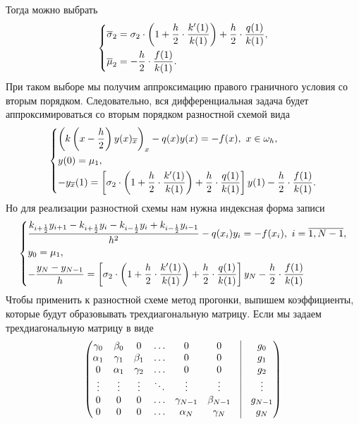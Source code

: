 \documentclass[a4paper, 12pt]{article}
\begin{document}
    Тогда можно выбрать
    $$\begin{dcases}
    	\overline \sigma_2 = \sigma_2\cdot \left(1 + \dfrac h2 \cdot\dfrac { k'(1)}{ k(1)}\right) + \dfrac h 2 \cdot \dfrac {q(1)}{k(1)} ,\\
    	\overline \mu_2 = -\dfrac h 2 \cdot \dfrac {f(1)}{k(1)}.
    \end{dcases}$$
    При таком выборе мы получим аппроксимацию правого граничного условия со вторым порядком. Следовательно, вся дифференциальная задача будет аппроксимироваться со вторым порядком разностной схемой вида
    \begin{equation}
    	\begin{dcases}
    		\left(k\left(x - \dfrac h2\right) y(x)_{\overline x}\right)_x - q(x) y(x) = -f(x),\ x \in \omega_h,\\
    		y(0) = \mu_1,\\
    		-y_{\overline x}(1) =\left[\sigma_2\cdot \left(1 + \dfrac h2 \cdot\dfrac { k'(1)}{ k(1)}\right) + \dfrac h 2 \cdot \dfrac {q(1)}{k(1)} \right] y(1) - \dfrac h 2 \cdot \dfrac {f(1)}{k(1)}.
    	\end{dcases}
    \end{equation}
    Но для реализации разностной схемы нам нужна индексная форма записи
    \begin{equation}
    	\begin{dcases}
    		\dfrac{k_{i+\frac12}y_{i+1} - k_{i+\frac12} y_i -k_{i-\frac12} y_i + k_{i-\frac12} y_{i-1} }{h^2} - q(x_i) y_i = -f(x_i),\ i = \overline{1, N-1},\\
    		y_0 = \mu_1,\\
    		- \dfrac{y_N - y_{N-1}}{h} = \left[\sigma_2\cdot \left(1 + \dfrac h2 \cdot\dfrac { k'(1)}{ k(1)}\right) + \dfrac h 2 \cdot \dfrac {q(1)}{k(1)} \right] y_N - \dfrac h 2 \cdot \dfrac {f(1)}{k(1)}
    	\end{dcases}
    \end{equation}
    Чтобы применить к разностной схеме метод прогонки, выпишем коэффициенты, которые будут образовывать трехдиагональную матрицу. Если мы задаем трехдиагональную матрицу в виде
    \begin{equation}
    	\begin{pmatrix} 
    		\gamma_0 & \beta_0 & 0 & \ldots & 0 & 0 & \vrule & g_0 \\ 
    		\alpha_1 & \gamma_1 & \beta_1 & \ldots & 0 & 0 & \vrule & g_1\\ 
    		0 & \alpha_1 & \gamma_2 & \ldots & 0 & 0 & \vrule & g_2\\ 
    		\vdots & \vdots & \vdots & \ddots & \vdots & \vdots & \vrule & \vdots\\ 
    		0 & 0 & 0 & \ldots& \gamma_{N-1} & \beta_{N-1} & \vrule & g_{N-1} \\ 
    		0 & 0 & 0 & \ldots& \alpha_N& \gamma_N & \vrule & g_N\\\end{pmatrix}
    \end{equation}
\end{document}
